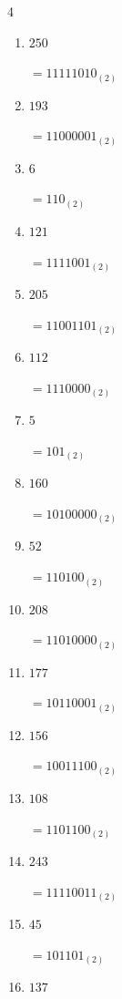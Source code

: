 \begin{multicols}{4}
\begin{enumerate}
        $=11100010_{(2)}$

  \item $250$

        $=11111010_{(2)}$

  \item $193$

        $=11000001_{(2)}$

  \item $6$

        $=110_{(2)}$

  \item $121$

        $=1111001_{(2)}$

  \item $205$

        $=11001101_{(2)}$

  \item $112$

        $=1110000_{(2)}$

  \item $5$

        $=101_{(2)}$

  \item $160$

        $=10100000_{(2)}$

  \item $52$

        $=110100_{(2)}$

  \item $208$

        $=11010000_{(2)}$

  \item $177$

        $=10110001_{(2)}$

  \item $156$

        $=10011100_{(2)}$

\columnbreak %

  \item $108$

        $=1101100_{(2)}$

  \item $243$

        $=11110011_{(2)}$

  \item $45$

        $=101101_{(2)}$

  \item $137$


\end{enumerate}
\end{multicols}
